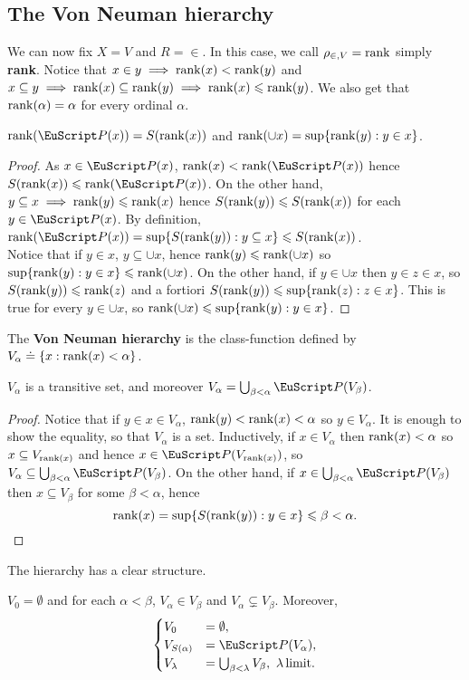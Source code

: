 \documentclass[twoside,openright,titlepage,numbers=noenddot,%
               headinclude,footinclude,cleardoublepage=empty,abstract=on,
               BCOR=23mm,paper=letter,fontsize=11pt
               ]{scrreprt}
\begin{document}
\subsection{The Von Neuman hierarchy}
We can now fix $X = V$ and $R = \in$. In this case, we call $\rho_{\in, V} = \mathrm{rank}$ simply \textbf{rank}. Notice that $x \in y \implies \mathrm{rank}(x) < \mathrm{rank}(y)$ and $x \subseteq y \implies \mathrm{rank}(x) \subseteq \mathrm{rank}(y) \implies \mathrm{rank}(x) \leqslant \mathrm{rank}(y)$. We also get that $\mathrm{rank}(\alpha) = \alpha$ for every ordinal $\alpha$.
\begin{proposition}
    $\rank(\P(x)) = S(\rank(x))$ and $\mathrm{rank}(\cup x) = \sup\{\mathrm{rank}(y): y \in x\}$.
\end{proposition}
\begin{proof}
    As $x \in \P(x)$, $\rank(x) < \rank(\P(x))$ hence $S(\rank(x)) \leq \rank(\P(x))$. On the other hand, $y \subseteq x \implies \mathrm{rank}(y) \leqslant \mathrm{rank}(x)$ hence $S(\mathrm{rank}(y)) \leqslant S(\mathrm{rank}(x))$ for each $y \in \P(x)$. By definition, $\rank(\P(x)) = \sup\{S(\rank(y)): y \subseteq x\} \leq S(\rank(x))$. \\
    Notice that if $y \in x$, $y \subseteq \cup x$, hence $\mathrm{rank}(y) \leqslant \mathrm{rank}(\cup x)$ so $\sup\{\mathrm{rank}(y): y \in x\} \leqslant \mathrm{rank}(\cup x)$. On the other hand, if $y \in \cup x$ then $y \in z \in x$, so $S(\mathrm{rank}(y)) \leqslant \mathrm{rank}(z)$ and a fortiori $S(\mathrm{rank}(y)) \leqslant \sup\{\mathrm{rank}(z): z \in x\}$. This is true for every $y \in \cup x$, so $\mathrm{rank}(\cup x) \leqslant \sup\{\mathrm{rank}(y): y \in x\}$.
\end{proof}
The \textbf{Von Neuman hierarchy} is the class-function defined by $V_{\alpha} \hskip1mm\dot{=}\hskip1mm \{x: \mathrm{rank}(x) < \alpha\}$.
\begin{theorem}
    $V_{\alpha}$ is a transitive set, and moreover $V_{\alpha} = \bigcup_{\beta < \alpha} \P(V_{\beta})$.
\end{theorem}
\begin{proof}
    Notice that if $y \in x \in V_{\alpha}$, $\mathrm{rank}(y) < \mathrm{rank}(x) < \alpha$ so $y \in V_{\alpha}$. It is enough to show the equality, so that $V_{\alpha}$ is a set.
    Inductively, if $x \in V_{\alpha}$ then $\mathrm{rank}(x) < \alpha$ so $x \subseteq V_{\mathrm{rank}(x)}$ and hence $x \in \P(V_{\rank(x)})$, so $V_{\alpha} \subseteq \bigcup_{\beta < \alpha} \P(V_{\beta})$. On the other hand, if $x \in \bigcup_{\beta < \alpha} \P(V_{\beta})$ then $x \subseteq V_{\beta}$ for some $\beta < \alpha$, hence
    \[ \mathrm{rank}(x) = \sup\{S(\mathrm{rank}(y)): y \in x\} \leqslant \beta < \alpha. \]
\end{proof}
The hierarchy has a clear structure.
\begin{proposition}
    $V_0 = \emptyset$ and for each $\alpha < \beta$, $V_\alpha \in V_\beta$ and $V_\alpha \subsetneq V_\beta$. Moreover,
    \begin{align*}
        \begin{cases}
            V_0 &= \emptyset, \\
            V_{S(\alpha)} &= \P(V_{\alpha}), \\
            V_\lambda &= \bigcup_{\beta < \lambda} V_\beta, \, \, \lambda \, \text{limit}.
        \end{cases}
    \end{align*}
\end{proposition}
\end{document}
